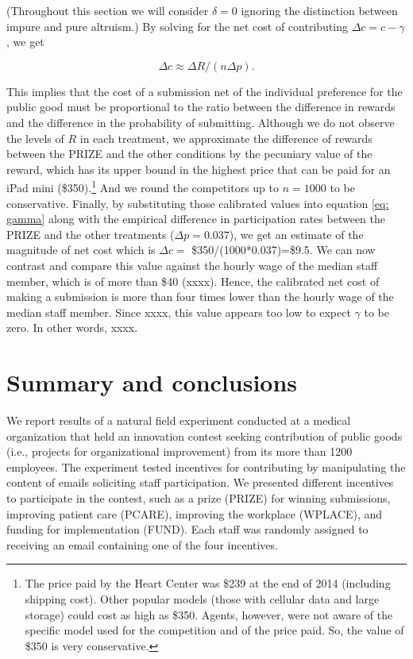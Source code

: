 \documentclass[11pt, titlepage]{article}
\begin{document}
(Throughout this section we will consider \(\delta=0\) ignoring the
distinction between impure and pure altruism.) By solving for the net
cost of contributing \(\Delta c=c-\gamma\), we get

\begin{equation}
  \label{eq: gamma}
  \Delta c\approx  \Delta R / (n\Delta p). 
\end{equation}

This implies that the cost of a submission net of the individual
preference for the public good must be proportional to the ratio between
the difference in rewards and the difference in the probability of
submitting. Although we do not observe the levels of \(R\) in each
treatment, we approximate the difference of rewards between the PRIZE
and the other conditions by the pecuniary value of the reward, which has
its upper bound in the highest price that can be paid for an iPad mini
(\$350).\footnote{The price paid by the Heart Center was \$239 at the
  end of 2014 (including shipping cost). Other popular models (those
  with cellular data and large storage) could cost as high as \$350.
  Agents, however, were not aware of the specific model used for the
  competition and of the price paid. So, the value of \$350 is very
  conservative.} And we round the competitors up to \(n=1000\) to be
conservative. Finally, by substituting those calibrated values into
equation \eqref{eq: gamma} along with the empirical difference in
participation rates between the PRIZE and the other treatments
(\(\Delta p=0.037\)), we get an estimate of the magnitude of net cost
which is \(\Delta c=\) \$350/(1000*0.037)=\$9.5. We can now contrast and
compare this value against the hourly wage of the median staff member,
which is of more than \$40 (xxxx). Hence, the calibrated net cost of
making a submission is more than four times lower than the hourly wage
of the median staff member. Since xxxx, this value appears too low to
expect \(\gamma\) to be zero. In other words, xxxx.

\section{Summary and conclusions}\label{summary-and-conclusions}

We report results of a natural field experiment conducted at a medical
organization that held an innovation contest seeking contribution of
public goods (i.e., projects for organizational improvement) from its
more than 1200 employees. The experiment tested incentives for
contributing by manipulating the content of emails soliciting staff
participation. We presented different incentives to participate in the
contest, such as a prize (PRIZE) for winning submissions, improving
patient care (PCARE), improving the workplace (WPLACE), and funding for
implementation (FUND). Each staff was randomly assigned to receiving an
email containing one of the four incentives.
\end{document}
